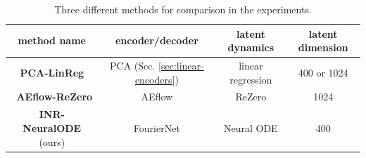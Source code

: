 \documentclass{article}
\begin{document}
\begin{table}
	\centering
	\begin{tabular}{c|c|c|c}
		\hline
		method name                   & encoder/decoder                            & latent dynamics                                    & latent dimension \\
		\hline
		\textbf{PCA-LinReg}           & PCA (Sec. \ref{sec:linear-encoders})       & linear regression                                  & 400 or 1024      \\
		\hline\
		\textbf{AEflow-ReZero}        & AEflow\cite{AEflow}                        & ReZero\cite{bachlechner2021rezero}                 & 1024             \\
		\hline
		\textbf{INR-NeuralODE} (ours) & FourierNet\cite{fathony2021multiplicative} & Neural ODE\cite{chen2018NeuralODE,chen2021eventfn} & 400              \\
		\hline
	\end{tabular}
	\caption{Three different methods for comparison in the experiments.}
	\label{tab:comp_methods}
\end{table}

\end{document}
